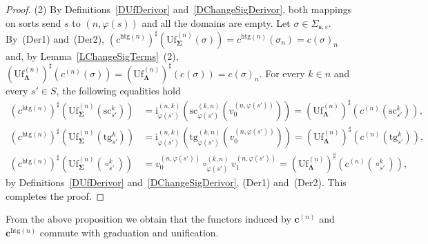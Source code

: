 \documentclass[a4paper, reqno]{amsbook}
\newcommand{\sig}[1]{\mathbf{#1}}             %
\newcommand{\htg}{\mathrm{htg}}                %
\newcommand{\src}{\mathrm{sc}}
\newcommand{\tgt}{\mathrm{tg}}
\newcommand{\Uf}{\mathrm{Uf}}
\theoremstyle{plain}
\theoremstyle{definition}
\begin{document}
\begin{proof}
(2) By Definitions~\ref{DUfDerivor} and~\ref{DChangeSigDerivor}, both mappings on sorts send $s$ to $(n,\varphi(s))$ and all the domains are empty.
Let $\sigma\in\Sigma_{\mathbf{s},s}$.
By~(Der1) and~(Der2), $(c^{\htg(n)})^{\sharp}(\Uf^{(n)}_{\sig{\Sigma}}(\sigma))=c^{\htg(n)}(\sigma_{n})=c(\sigma)_{n}$ and, by Lemma~\ref{LChangeSigTerms}~(2), $(\Uf^{(n)}_{\sig{\Lambda}})^{\sharp}(c^{(n)}(\sigma))=(\Uf^{(n)}_{\sig{\Lambda}})^{\sharp}(c(\sigma))=c(\sigma)_{n}$.
For every $k\in n$ and every $s'\in S$, the following equalities hold
\begin{align*}
(c^{\htg(n)})^{\sharp}\left(\Uf^{(n)}_{\sig{\Sigma}}(\src^{k}_{s'})\right)
&=
\mathrm{i}^{(n,k)}_{\varphi(s')}\left(\src^{(k,n)}_{\varphi(s')}\left(v^{(n,\varphi(s'))}_{0}\right)\right)
=
(\Uf^{(n)}_{\sig{\Lambda}})^{\sharp}\left(c^{(n)}(\src^{k}_{s'})\right),
\\
(c^{\htg(n)})^{\sharp}\left(\Uf^{(n)}_{\sig{\Sigma}}(\tgt^{k}_{s'})\right)
&=
\mathrm{i}^{(n,k)}_{\varphi(s')}\left(\tgt^{(k,n)}_{\varphi(s')}\left(v^{(n,\varphi(s'))}_{0}\right)\right)
=
(\Uf^{(n)}_{\sig{\Lambda}})^{\sharp}\left(c^{(n)}(\tgt^{k}_{s'})\right),
\\
(c^{\htg(n)})^{\sharp}\left(\Uf^{(n)}_{\sig{\Sigma}}(\circ^{k}_{s'})\right)
&=
v^{(n,\varphi(s'))}_{0}\circ^{(k,n)}_{\varphi(s')}v^{(n,\varphi(s'))}_{1}
=
(\Uf^{(n)}_{\sig{\Lambda}})^{\sharp}\left(c^{(n)}(\circ^{k}_{s'})\right),
\end{align*}
by Definitions~\ref{DUfDerivor} and~\ref{DChangeSigDerivor}, (Der1) and~(Der2). This completes the proof.
\end{proof}

From the above proposition we obtain that the functors induced by $\mathbf{c}^{(n)}$ and $\mathbf{c}^{\htg(n)}$ commute with graduation and unification.
\end{document}
